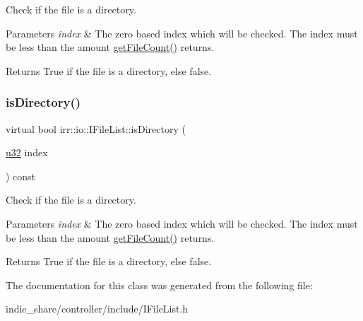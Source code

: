 Check if the file is a directory. 


\begin{DoxyParams}{Parameters}
{\em index} & The zero based index which will be checked. The index must be less than the amount \hyperlink{classirr_1_1io_1_1IFileList_a871861be76e18d58274c4580b1d103b9}{get\+File\+Count()} returns. \\
\hline
\end{DoxyParams}
\begin{DoxyReturn}{Returns}
True if the file is a directory, else false. 
\end{DoxyReturn}
\mbox{\label{classirr_1_1io_1_1IFileList_a0f2cb8c99e9ecc4b56d08718c885a5af}} 
\subsubsection{\texorpdfstring{is\+Directory()}{isDirectory()}\hspace{0.1cm}{\footnotesize\ttfamily [2/2]}}
{\footnotesize\ttfamily virtual bool irr\+::io\+::\+I\+File\+List\+::is\+Directory (\begin{DoxyParamCaption}\item[{\hyperlink{namespaceirr_a0416a53257075833e7002efd0a18e804}{u32}}]{index }\end{DoxyParamCaption}) const\hspace{0.3cm}{\ttfamily [pure virtual]}}



Check if the file is a directory. 


\begin{DoxyParams}{Parameters}
{\em index} & The zero based index which will be checked. The index must be less than the amount \hyperlink{classirr_1_1io_1_1IFileList_a871861be76e18d58274c4580b1d103b9}{get\+File\+Count()} returns. \\
\hline
\end{DoxyParams}
\begin{DoxyReturn}{Returns}
True if the file is a directory, else false. 
\end{DoxyReturn}


The documentation for this class was generated from the following file\+:\begin{DoxyCompactItemize}
\item 
indie\+\_\+share/controller/include/I\+File\+List.\+h\end{DoxyCompactItemize}
